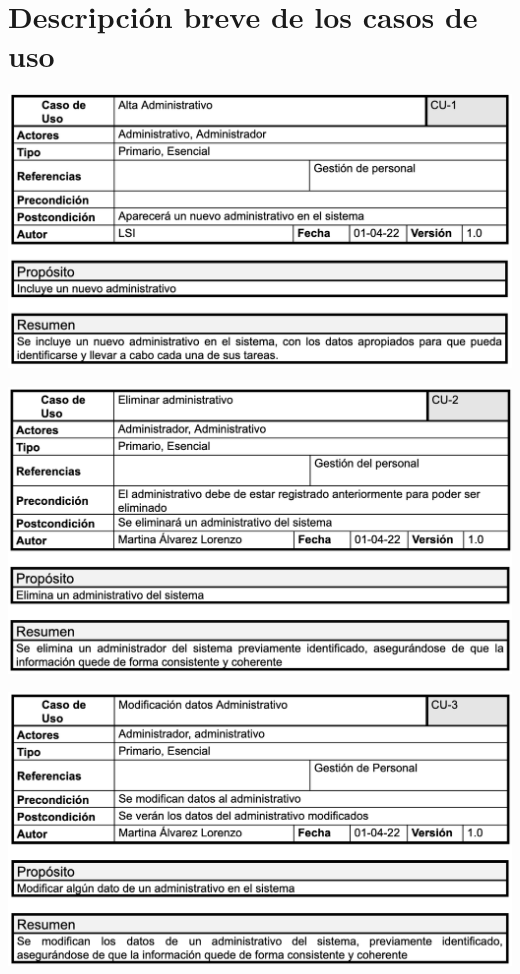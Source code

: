 \documentclass[12pt, spanish]{article}
\begin{document}

\section{Descripción breve de los casos de uso}

\begin{centering}\includegraphics[scale = 0.70]{casos_de_uso/1.png}\\[1.0 cm]\end{centering}
\begin{centering}\includegraphics[scale = 0.70]{casos_de_uso/2.png}\\[1.0 cm]\end{centering}
\begin{centering}\includegraphics[scale = 0.70]{casos_de_uso/3.png}\\[1.0 cm]\end{centering}
\end{document}
